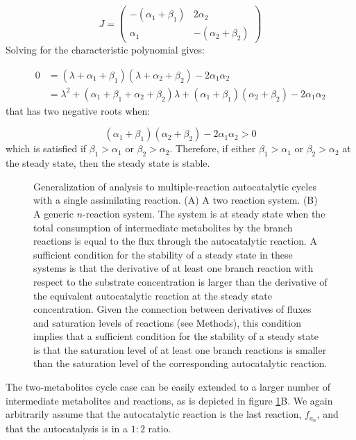     \begin{equation*}
        J=
        \begin{pmatrix}
            -(\alpha_1+\beta_1) & 2\alpha_2 \\
            \alpha_1 & -(\alpha_2+\beta_2)
        \end{pmatrix}
    \end{equation*}
    Solving for the characteristic polynomial gives:

    \begin{align*}
        0 & =(\lambda+\alpha_1+\beta_1)(\lambda+\alpha_2+\beta_2)-2\alpha_1\alpha_2 \\
        & = \lambda^2+(\alpha_1+\beta_1+\alpha_2+\beta_2)\lambda+(\alpha_1+\beta_1)(\alpha_2+\beta_2)-2\alpha_1\alpha_2
    \end{align*}
    that has two negative roots when:

    \begin{equation*}
        (\alpha_1+\beta_1)(\alpha_2+\beta_2)-2\alpha_1\alpha_2>0
    \end{equation*}
    which is satisfied if $\beta_1 > \alpha_1$ or $\beta_2 > \alpha_2$.
    Therefore, if either $\beta_1 > \alpha_1$ or $\beta_2 > \alpha_2$ at the steady state, then the steady state is stable.

\begin{figure}[!htb]
  \centering
      
     \caption{
     Generalization of analysis to multiple-reaction autocatalytic cycles with a single assimilating reaction.
     (A) A two reaction system.
     (B) A generic $n$-reaction system.
     The system is at steady state when the total consumption of intermediate metabolites by the branch reactions is equal to the flux through the autocatalytic reaction.
     A sufficient condition for the stability of a steady state in these systems is that the derivative of at least one branch reaction with respect to the substrate concentration is larger than the derivative of the equivalent autocatalytic reaction at the steady state concentration.
     Given the connection between derivatives of fluxes and saturation levels of reactions (see Methods), this condition implies that a sufficient condition for the stability of a steady state is that the saturation level of at least one branch reactions is smaller than the saturation level of the corresponding autocatalytic reaction.
 }
     \label{fig:multiple}
\end{figure}

    The two-metabolites cycle case can be easily extended to a larger number of intermediate metabolites and reactions, as is depicted in figure \ref{fig:multiple}B.
    We again arbitrarily assume that the autocatalytic reaction is the last reaction, $f_{a_n}$, and that the autocatalysis is in a $1:2$ ratio.


